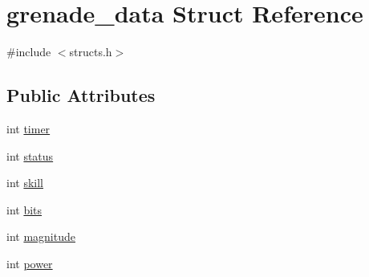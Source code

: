 \hypertarget{structgrenade__data}{\section{grenade\-\_\-data Struct Reference}
\label{structgrenade__data}
}


{\ttfamily \#include $<$structs.\-h$>$}

\subsection*{Public Attributes}
\begin{DoxyCompactItemize}
\item 
int \hyperlink{structgrenade__data_a57800189fccf7530e4497102c8fdd203}{timer}
\item 
int \hyperlink{structgrenade__data_ad08b07a9b38e50e92559ae368a8f845c}{status}
\item 
int \hyperlink{structgrenade__data_a9bff04e0e06b0154450e9ff48d0bf3a6}{skill}
\item 
int \hyperlink{structgrenade__data_a46484cc301a9a80eddbc7dde6566fb3e}{bits}
\item 
int \hyperlink{structgrenade__data_a59c291091ff3df3d9e8aa03fa79c526e}{magnitude}
\item 
int \hyperlink{structgrenade__data_acfbd2c54ce5924b79f629f87c2b7f520}{power}
\end{DoxyCompactItemize}


